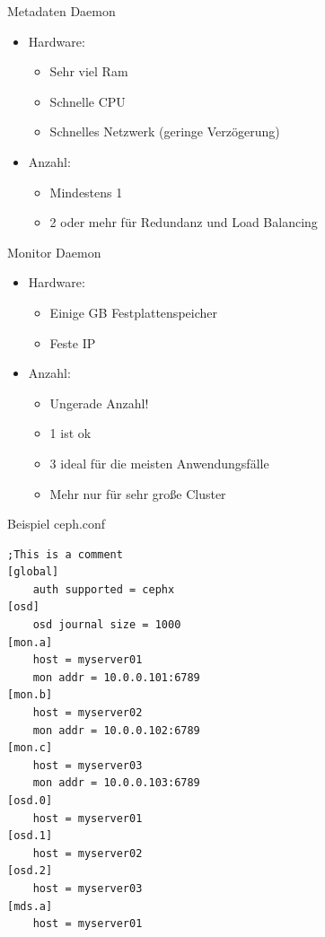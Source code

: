 \documentclass[hyperref={xetex}]{beamer}
\begin{document}
\begin{frame}{Metadaten Daemon}
	\begin{itemize}

		\item Hardware:
		\begin{itemize}
			\item Sehr viel Ram
			\item Schnelle CPU
			\item Schnelles Netzwerk (geringe Verz\"ogerung)
		\end{itemize}
		\item Anzahl: 
		\begin{itemize}
			\item Mindestens 1
			\item 2 oder mehr f\"ur Redundanz und Load Balancing
		\end{itemize}
	\end{itemize}
\end{frame}


\begin{frame}{Monitor Daemon}
	\begin{itemize}
		\item Hardware:
		\begin{itemize}
			\item Einige GB Festplattenspeicher
			\item Feste IP
		\end{itemize}
		\item Anzahl:
		\begin{itemize}
			\item Ungerade Anzahl!
			\item 1 ist ok
			\item 3 ideal f\"ur die meisten Anwendungsf\"alle
			\item Mehr nur f\"ur sehr große Cluster
		\end{itemize}
	\end{itemize}
\end{frame}

\begin{frame}[fragile]{Beispiel ceph.conf}

\begin{lstlisting}
;This is a comment
[global]
	auth supported = cephx
[osd]
	osd journal size = 1000
[mon.a]
	host = myserver01
	mon addr = 10.0.0.101:6789
[mon.b]
	host = myserver02
	mon addr = 10.0.0.102:6789
[mon.c]
	host = myserver03
	mon addr = 10.0.0.103:6789
[osd.0]
	host = myserver01
[osd.1]
	host = myserver02
[osd.2]
	host = myserver03
[mds.a]
	host = myserver01
\end{lstlisting}
\end{frame}
\end{document}

